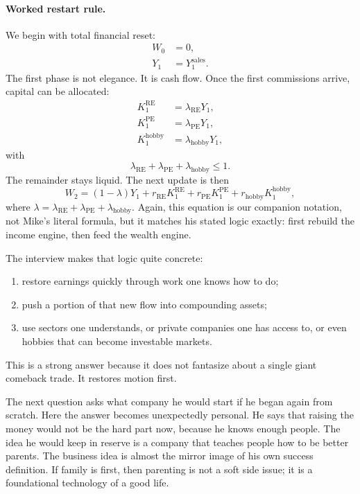 \paragraph{Worked restart rule.}
We begin with total financial reset:
\begin{align}
W_0 &= 0,\\
Y_1 &= Y_1^{\text{sales}}.
\end{align}
The first phase is not elegance. It is cash flow. Once the first commissions arrive, capital can be allocated:
\begin{align}
K_1^{\text{RE}} &= \lambda_{\text{RE}}Y_1,\\
K_1^{\text{PE}} &= \lambda_{\text{PE}}Y_1,\\
K_1^{\text{hobby}} &= \lambda_{\text{hobby}}Y_1,
\end{align}
with
\begin{equation}
\lambda_{\text{RE}}+\lambda_{\text{PE}}+\lambda_{\text{hobby}}\le 1.
\end{equation}
The remainder stays liquid. The next update is then
\begin{equation}
W_2=(1-\lambda)Y_1+r_{\text{RE}}K_1^{\text{RE}}+r_{\text{PE}}K_1^{\text{PE}}+r_{\text{hobby}}K_1^{\text{hobby}},
\end{equation}
where \(\lambda=\lambda_{\text{RE}}+\lambda_{\text{PE}}+\lambda_{\text{hobby}}\). Again, this equation is our companion notation, not Mike's literal formula, but it matches his stated logic exactly: first rebuild the income engine, then feed the wealth engine.

The interview makes that logic quite concrete:
\begin{enumerate}
\item restore earnings quickly through work one knows how to do;
\item push a portion of that new flow into compounding assets;
\item use sectors one understands, or private companies one has access to, or even hobbies that can become investable markets.
\end{enumerate}
This is a strong answer because it does not fantasize about a single giant comeback trade. It restores motion first.

The next question asks what company he would start if he began again from scratch. Here the answer becomes unexpectedly personal. He says that raising the money would not be the hard part now, because he knows enough people. The idea he would keep in reserve is a company that teaches people how to be better parents. The business idea is almost the mirror image of his own success definition. If family is first, then parenting is not a soft side issue; it is a foundational technology of a good life.

